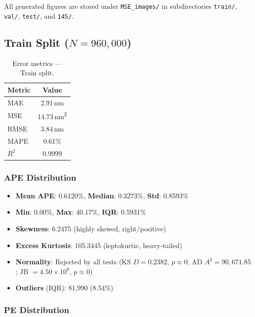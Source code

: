 \documentclass[11pt,a4paper]{article}
\begin{document}
All generated figures are stored under \texttt{MSE\_images/} in subdirectories \texttt{train/}, \texttt{val/}, \texttt{test/}, and \texttt{145/}.

\subsection{Train Split ($N = 960,000$)}

\begin{table}[H]
\centering
\caption{Error metrics — Train split.}
\label{tab:metrics_train}
\begin{tabular}{lc}
\toprule
\textbf{Metric} & \textbf{Value} \\
\midrule
MAE                 & 2.91\,nm \\
MSE                 & 14.73\,nm\textsuperscript{2} \\
RMSE                & 3.84\,nm \\
MAPE                & 0.61\% \\
$R^2$               & 0.9999 \\
\bottomrule
\end{tabular}
\end{table}

\subsubsection{APE Distribution}

\begin{itemize}
  \item \textbf{Mean APE}: 0.6120\%, \textbf{Median}: 0.3273\%, \textbf{Std}: 0.8593\%
  \item \textbf{Min}: 0.00\%, \textbf{Max}: 40.17\%, \textbf{IQR}: 0.5931\%
  \item \textbf{Skewness}: 6.2475 (highly skewed, right/positive)
  \item \textbf{Excess Kurtosis}: 105.3445 (leptokurtic, heavy-tailed)
  \item \textbf{Normality}: Rejected by all tests (KS $D = 0.2382$, $p \approx 0$; AD $A^2 = 90{,}671.85$; JB $= 4.50 \times 10^{8}$, $p \approx 0$)
  \item \textbf{Outliers} (IQR): 81,990 (8.54\%)
\end{itemize}

\subsubsection{PE Distribution}
\end{document}
